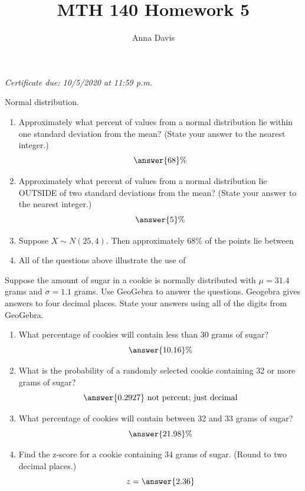 \documentclass{ximera}
\author{Anna Davis} \title{MTH 140 Homework 5}
\begin{document}
\begin{abstract}

\end{abstract}
\maketitle
 \textit{Certificate due: 10/5/2020 at 11:59 p.m.}
\begin{problem}\label{prob:140hom5prob1}
Normal distribution.
\begin{enumerate} 
\item
Approximately what percent of values from a normal distribution lie within one standard deviation from the mean? (State your answer to the nearest integer.)
$$\answer{68}\%$$
\item Approximately what percent of values from a normal distribution lie OUTSIDE of two standard deviations from the mean?  (State your answer to the nearest integer.)
$$\answer{5}\%$$
\item Suppose $X\sim N(25, 4)$.  Then approximately 68\% of the points lie between 

\item All of the questions above illustrate the use of 
\end{enumerate}

\end{problem}

\begin{problem}\label{prob:140hom5prob2}
Suppose the amount of sugar in a cookie is normally distributed with $\mu=31.4$ grams and $\sigma=1.1$ grams.  Use GeoGebra to answer the questions.  Geogebra gives answers to four decimal places.  State your answers using all of the digits from GeoGebra.
\begin{center}  
\end{center}
\begin{enumerate}
    \item What percentage of cookies will contain less than 30 grams of sugar?
    $$\answer{10.16}\%$$
    \item What is the probability of a randomly selected cookie containing 32 or more grams of sugar?
    $$\answer{0.2927}\mbox{ not percent; just decimal}$$
    \item What percentage of cookies will contain between 32 and 33 grams of sugar?
    $$\answer{21.98}\%$$
    \item Find the z-score for a cookie containing 34 grams of sugar.  (Round to two decimal places.)
    $$z=\answer{2.36}$$
\end{enumerate}
\end{problem}
\end{document}
